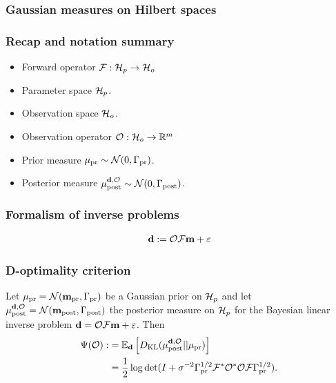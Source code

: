 \documentclass{beamer}
\begin{document}
\begin{frame}
\frametitle{Gaussian measures on Hilbert spaces}
\end{frame}

\begin{frame}
\frametitle{Recap and notation summary}
\begin{itemize}
\item Forward operator \(\mathcal{F}: \mathcal{H}_p \to \mathcal{H}_o\)
\item Parameter space $\mathcal{H}_p$.
\item Observation space $\mathcal{H}_o$.
\item Observation operator $\mathcal{O}: \mathcal{H}_o \to \mathbb{R}^m$
\item Prior measure $\mu_{\textup{pr}} \sim \mathcal{N}(0, \Gamma_{\textup{pr}})$.
\item Posterior measure $\mu_{\textup{post}}^{\mathbf{d}, \mathcal{O}} \sim \mathcal{N}(0, \Gamma_{\textup{post}})$.
\end{itemize}
\end{frame}

\begin{frame}
  \frametitle{Formalism of inverse problems}
  \begin{align}\label{eq:inverse problem}
    \mathbf{d} := \mathcal{O} \mathcal{F} \mathbf{m} + \varepsilon
  \end{align}
  
\end{frame}

\begin{frame}
  \frametitle{D-optimality criterion}
  \begin{theorem}\label{thm:d optimality}
    Let \(\mu_{\textup{pr}} = \mathcal{N}(\mathbf{m}_{\textup{pr}},\Gamma_{\textup{pr}})\) be a Gaussian prior on \(\mathcal{H}_p\)
    and let \(\mu_{\textup{post}}^{\mathbf{d}, \mathcal{O}} = \mathcal{N}(\mathbf{m}_{\textup{post}},\Gamma_{\textup{post}})\) the posterior measure
    on \(\mathcal{H}_p\) for the Bayesian linear inverse problem \(\mathbf{d} = \mathcal{O}
    \mathcal{F}\mathbf{m} +  \varepsilon\). Then
    \begin{align}\label{eq:objective}
      \begin{split}
        \Psi( \mathcal{O}) :&= \mathbb{E}_{\mathbf{d}}\left [ D_{\text{KL}} (\mu_{\textup{post}}^{\mathbf{d}, \mathcal{O}} || \mu_{\textup{pr}} ) \right ] \\
        &= \frac12 \log \det 
        ( I + \sigma^{-2} \Gamma_{\textup{pr}}^{1/2}  \mathcal{F} ^* \mathcal{O}^* \mathcal{O} \mathcal{F} \Gamma_{\textup{pr}}^{1/2}).
      \end{split}
    \end{align}
  \end{theorem}

\end{frame}
\end{document}
